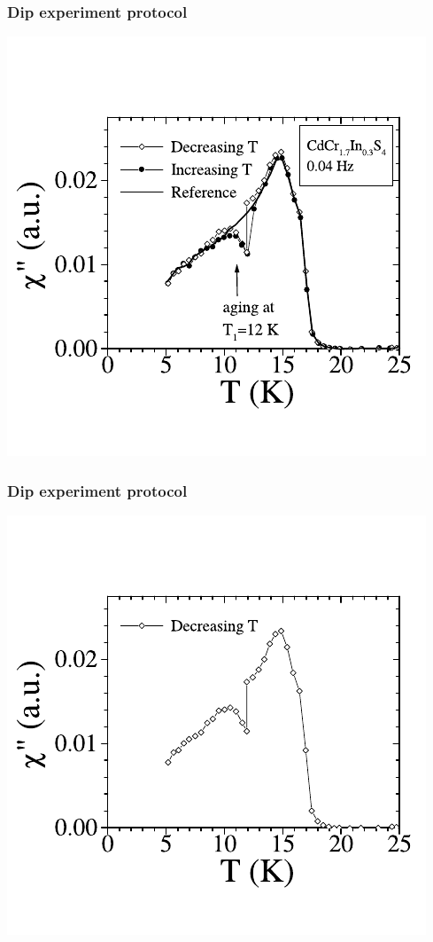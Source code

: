 \documentclass{beamer}
\begin{document}
\begin{frame}
  \frametitle{Dip experiment protocol}
  \begin{center}
    \includegraphics{images/dip_full.pdf}
  \end{center}
\end{frame}

\begin{frame}
  \frametitle{Dip experiment protocol}
  \begin{center}
    \includegraphics{images/dip_onlydecrease.pdf}
  \end{center}
\end{frame}
\end{document}
